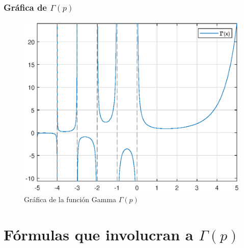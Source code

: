 \begin{frame}
\frametitle{Gráfica de $\Gamma (p)$}
\begin{figure}[h!]
   \centering
   \includegraphics[scale=0.55]{Imagenes/Plot_Gamma.eps}
   \caption{Gráfica de la función Gamma $\Gamma (p)$}
   \label{fig:figura_plot_gamma}
\end{figure}
\end{frame}
\section{Fórmulas que involucran a \texorpdfstring{$\Gamma (p)$}{}}
